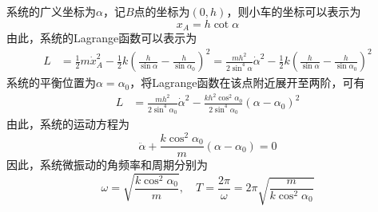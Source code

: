 \begin{solution}
系统的广义坐标为$\alpha$，记$B$点的坐标为$(0,h)$，则小车的坐标可以表示为
\begin{equation*}
	x_A = h\cot \alpha
\end{equation*}
由此，系统的Lagrange函数可以表示为
\begin{align*}
	L & = \frac12 m \dot{x}_A^2 - \frac12 k \left(\frac{h}{\sin \alpha} - \frac{h}{\sin \alpha_0}\right)^2 = \frac{mh^2}{2\sin^4 \alpha} \dot{\alpha}^2 - \frac12 k \left(\frac{h}{\sin \alpha} - \frac{h}{\sin \alpha_0}\right)^2
\end{align*}
系统的平衡位置为$\alpha = \alpha_0$，将Lagrange函数在该点附近展开至两阶，可有
\begin{align*}
	L & = \frac{mh^2}{2\sin^4 \alpha_0} \dot{\alpha}^2 - \frac{kh^2 \cos^2 \alpha_0}{2 \sin^4 \alpha_0}(\alpha-\alpha_0)^2 
\end{align*}
由此，系统的运动方程为
\begin{equation*}
	\ddot{\alpha} + \frac{k\cos^2 \alpha_0}{m} (\alpha-\alpha_0) = 0
\end{equation*}
因此，系统微振动的角频率和周期分别为
\begin{equation*}
	\omega = \sqrt{\frac{k\cos^2 \alpha_0}{m}},\quad T = \frac{2\pi}{\omega} = 2\pi \sqrt{\frac{m}{k\cos^2 \alpha_0}}
\end{equation*}
\end{solution}

